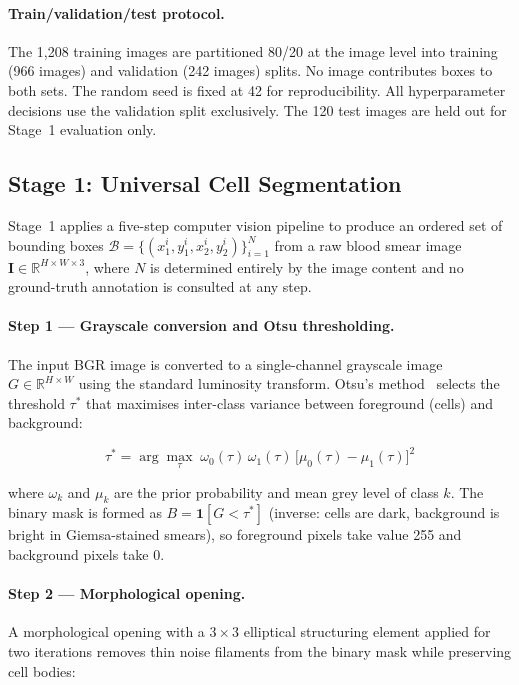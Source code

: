 \documentclass[10pt,twocolumn]{article}
\begin{document}
\paragraph{Train/validation/test protocol.}
The 1,208 training images are partitioned 80/20 at the image level into
training (966 images) and validation (242 images) splits. No image
contributes boxes to both sets. The random seed is fixed at 42 for
reproducibility. All hyperparameter decisions use the validation split
exclusively. The 120 test images are held out for Stage~1 evaluation only.

\subsection{Stage 1: Universal Cell Segmentation}
\label{ssec:stage1}

Stage~1 applies a five-step computer vision pipeline to produce an ordered
set of bounding boxes $\mathcal{B} = \{(x_1^i, y_1^i, x_2^i, y_2^i)\}_{i=1}^N$
from a raw blood smear image $\mathbf{I} \in \mathbb{R}^{H \times W \times 3}$,
where $N$ is determined entirely by the image content and no ground-truth
annotation is consulted at any step.

\paragraph{Step 1 — Grayscale conversion and Otsu thresholding.}
The input BGR image is converted to a single-channel grayscale image
$G \in \mathbb{R}^{H \times W}$ using the standard luminosity transform.
Otsu's method~\cite{otsu1979} selects the threshold $\tau^*$ that maximises
inter-class variance between foreground (cells) and background:

\begin{equation}
  \tau^* = \arg\max_\tau \; \omega_0(\tau)\,\omega_1(\tau)\,
  \bigl[\mu_0(\tau) - \mu_1(\tau)\bigr]^2
  \label{eq:otsu}
\end{equation}

where $\omega_k$ and $\mu_k$ are the prior probability and mean grey level
of class $k$. The binary mask is formed as $B = \mathbf{1}[G < \tau^*]$
(inverse: cells are dark, background is bright in Giemsa-stained smears),
so foreground pixels take value 255 and background pixels take 0.

\paragraph{Step 2 — Morphological opening.}
A morphological opening with a $3 \times 3$ elliptical structuring element
applied for two iterations removes thin noise filaments from the binary
mask while preserving cell bodies:
\end{document}

